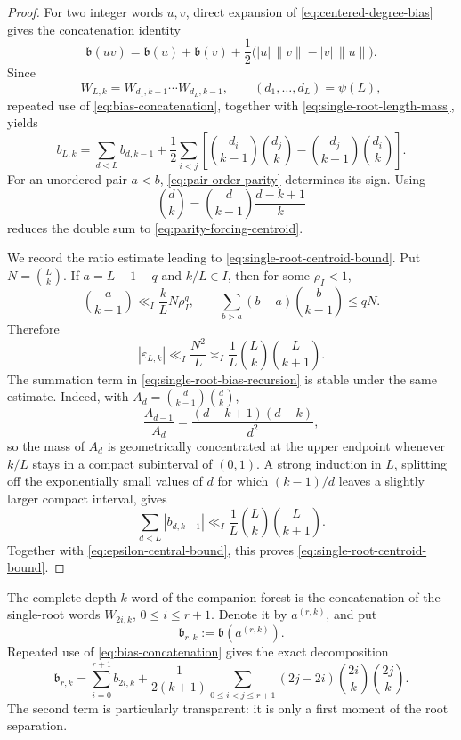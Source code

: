 \documentclass[11pt]{article}
\theoremstyle{definition}
\theoremstyle{remark}
\begin{document}
\begin{proof}
For two integer words \(u,v\), direct expansion of
\eqref{eq:centered-degree-bias} gives the concatenation identity
\begin{equation}
 \mathfrak b(uv)
 =\mathfrak b(u)+\mathfrak b(v)
 +\frac12\bigl(|u|\,\|v\|-|v|\,\|u\|\bigr).
 \label{eq:bias-concatenation}
\end{equation}
Since
\[
 W_{L,k}=W_{d_1,k-1}\cdots W_{d_L,k-1},
 \qquad (d_1,\ldots,d_L)=\psi(L),
\]
repeated use of \eqref{eq:bias-concatenation}, together with
\eqref{eq:single-root-length-mass}, yields
\[
 b_{L,k}=\sum_{d<L}b_{d,k-1}
 +\frac12\sum_{i<j}
 \left[
 \binom{d_i}{k-1}\binom{d_j}{k}
 -\binom{d_j}{k-1}\binom{d_i}{k}
 \right].
\]
For an unordered pair \(a<b\), \eqref{eq:pair-order-parity} determines its
sign.  Using
\[
 \binom d k=\binom d{k-1}\frac{d-k+1}{k}
\]
reduces the double sum to \eqref{eq:parity-forcing-centroid}.

We record the ratio estimate leading to
\eqref{eq:single-root-centroid-bound}.  Put \(N=\binom Lk\).  If
\(a=L-1-q\) and \(k/L\in I\), then for some \(\rho_I<1\),
\[
 \binom a{k-1}
 \ll_I \frac{k}{L}N\rho_I^q,
 \qquad
 \sum_{b>a}(b-a)\binom b{k-1}\le qN.
\]
Therefore
\begin{equation}
 |\varepsilon_{L,k}|
 \ll_I \frac{N^2}{L}
 \asymp_I
 \frac1L\binom Lk\binom L{k+1}.
 \label{eq:epsilon-central-bound}
\end{equation}
The summation term in \eqref{eq:single-root-bias-recursion} is stable under
the same estimate.  Indeed, with
\(A_d=\binom d{k-1}\binom d k\),
\[
 \frac{A_{d-1}}{A_d}
 =\frac{(d-k+1)(d-k)}{d^2},
\]
so the mass of \(A_d\) is geometrically concentrated at the upper endpoint
whenever \(k/L\) stays in a compact subinterval of \((0,1)\).  A strong
induction in \(L\), splitting off the exponentially small values of \(d\)
for which \((k-1)/d\) leaves a slightly larger compact interval, gives
\[
 \sum_{d<L}|b_{d,k-1}|
 \ll_I \frac1L\binom Lk\binom L{k+1}.
\]
Together with \eqref{eq:epsilon-central-bound}, this proves
\eqref{eq:single-root-centroid-bound}.
\end{proof}

The complete depth-\(k\) word of the companion forest is the concatenation
of the single-root words \(W_{2i,k}\), \(0\le i\le r+1\).  Denote it by
\(a^{(r,k)}\), and put
\begin{equation}
 \mathfrak b_{r,k}:=\mathfrak b(a^{(r,k)}).
 \label{eq:full-layer-bias}
\end{equation}
Repeated use of \eqref{eq:bias-concatenation} gives the exact decomposition
\begin{equation}
 {
 \mathfrak b_{r,k}
 =\sum_{i=0}^{r+1}b_{2i,k}
 +\frac{1}{2(k+1)}
 \sum_{0\le i<j\le r+1}
 (2j-2i)\binom{2i}{k}\binom{2j}{k}.
 }
 \label{eq:forest-bias-decomposition}
\end{equation}
The second term is particularly transparent: it is only a first moment of
the root separation.
\end{document}
